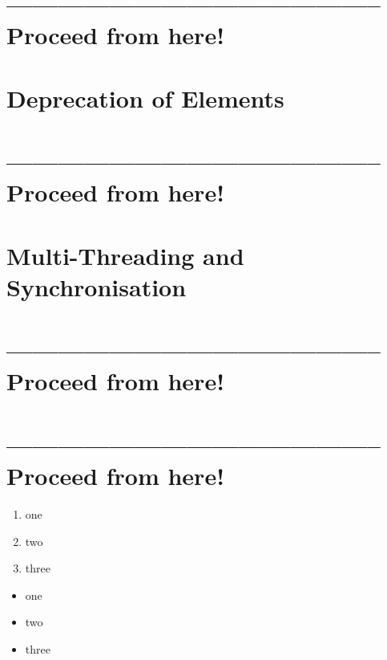 \section{-------------------------------------------- Proceed from here!}
\lipsum[1]


\section{Deprecation of Elements}\label{sec:DeprecationOfElements}
\section{-------------------------------------------- Proceed from here!}
\lipsum[1]


\section{Multi-Threading and Synchronisation}\label{sec:MultiThreading}
\section{-------------------------------------------- Proceed from here!}
\lipsum[1]

\hrulefill\newpage 
\section{-------------------------------------------- Proceed from here!}
\lipsum[1]

\begin{enumerate}[label=P\arabic*.]
\item{one}
\item{two}
\item{three}
\end{enumerate}

\begin{itemize}[nosep]
\item{one}
\item{two}
\item{three}
\end{itemize}


